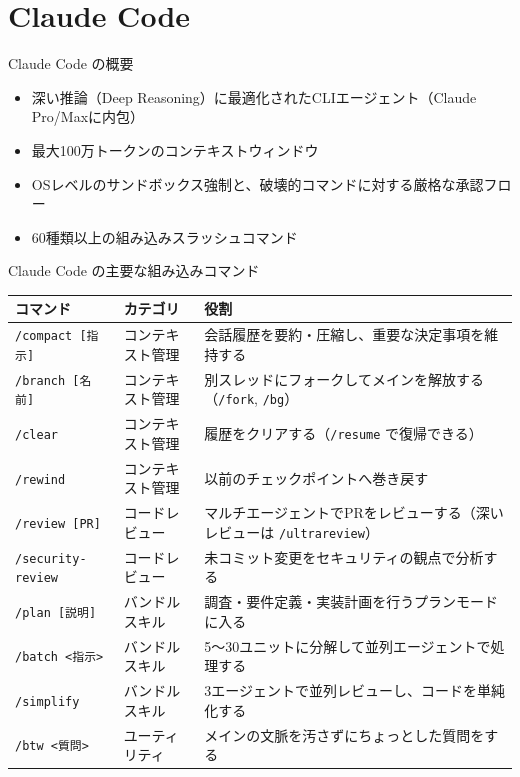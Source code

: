 \documentclass[aspectratio=169,11pt]{beamer}
\newcommand{\cmd}[1]{\texttt{#1}}
\begin{document}
\section{Claude Code}

\begin{frame}{Claude Code の概要}
  \begin{itemize}
    \item 深い推論（Deep Reasoning）に最適化されたCLIエージェント（Claude Pro/Maxに内包）\cite{r18}
    \item 最大100万トークンのコンテキストウィンドウ
    \item OSレベルのサンドボックス強制と、破壊的コマンドに対する厳格な承認フロー
    \item 60種類以上の組み込みスラッシュコマンド\cite{r9}
  \end{itemize}
\end{frame}

\begin{frame}{Claude Code の主要な組み込みコマンド}
  \scriptsize
  \begin{tabularx}{\textwidth}{P{30mm}P{24mm}L}
    \toprule
    コマンド & カテゴリ & 役割 \\
    \midrule
    \cmd{/compact [指示]} & コンテキスト管理 & 会話履歴を要約・圧縮し、重要な決定事項を維持する \\
    \cmd{/branch [名前]} & コンテキスト管理 & 別スレッドにフォークしてメインを解放する（\cmd{/fork}, \cmd{/bg}） \\
    \cmd{/clear} & コンテキスト管理 & 履歴をクリアする（\cmd{/resume} で復帰できる） \\
    \cmd{/rewind} & コンテキスト管理 & 以前のチェックポイントへ巻き戻す \\
    \cmd{/review [PR]} & コードレビュー & マルチエージェントでPRをレビューする（深いレビューは \cmd{/ultrareview}） \\
    \cmd{/security-review} & コードレビュー & 未コミット変更をセキュリティの観点で分析する \\
    \cmd{/plan [説明]} & バンドルスキル & 調査・要件定義・実装計画を行うプランモードに入る \\
    \cmd{/batch <指示>} & バンドルスキル & 5〜30ユニットに分解して並列エージェントで処理する \\
    \cmd{/simplify} & バンドルスキル & 3エージェントで並列レビューし、コードを単純化する \\
    \cmd{/btw <質問>} & ユーティリティ & メインの文脈を汚さずにちょっとした質問をする \\
    \bottomrule
  \end{tabularx}
  \par\hfill{\scriptsize\cite{r6,r8,r9}}
\end{frame}
\end{document}

